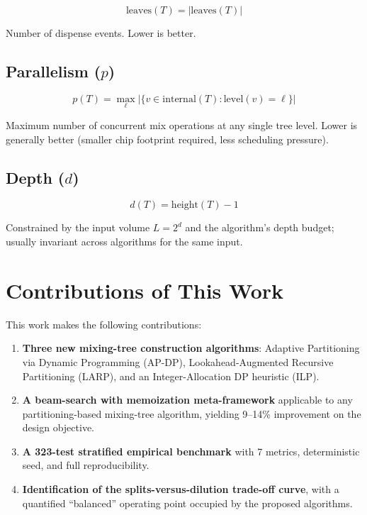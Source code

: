 \begin{equation}
\text{leaves}(T) = |\text{leaves}(T)|
\end{equation}

Number of dispense events. Lower is better.

\subsection{Parallelism ($p$)}

\begin{equation}
p(T) = \max_{\ell} |\{ v \in \text{internal}(T) : \text{level}(v) = \ell \}|
\end{equation}

Maximum number of concurrent mix operations at any single tree level. Lower is generally better (smaller chip footprint required, less scheduling pressure).

\subsection{Depth ($d$)}

\begin{equation}
d(T) = \text{height}(T) - 1
\end{equation}

Constrained by the input volume $L = 2^d$ and the algorithm's depth budget; usually invariant across algorithms for the same input.

\section{Contributions of This Work}

This work makes the following contributions:

\begin{enumerate}
    \item \textbf{Three new mixing-tree construction algorithms}: Adaptive Partitioning via Dynamic Programming (AP-DP), Lookahead-Augmented Recursive Partitioning (LARP), and an Integer-Allocation DP heuristic (ILP).
    \item \textbf{A beam-search with memoization meta-framework} applicable to any partitioning-based mixing-tree algorithm, yielding 9--14\% improvement on the design objective.
    \item \textbf{A 323-test stratified empirical benchmark} with 7 metrics, deterministic seed, and full reproducibility.
    \item \textbf{Identification of the splits-versus-dilution trade-off curve}, with a quantified ``balanced'' operating point occupied by the proposed algorithms.
\end{enumerate}

